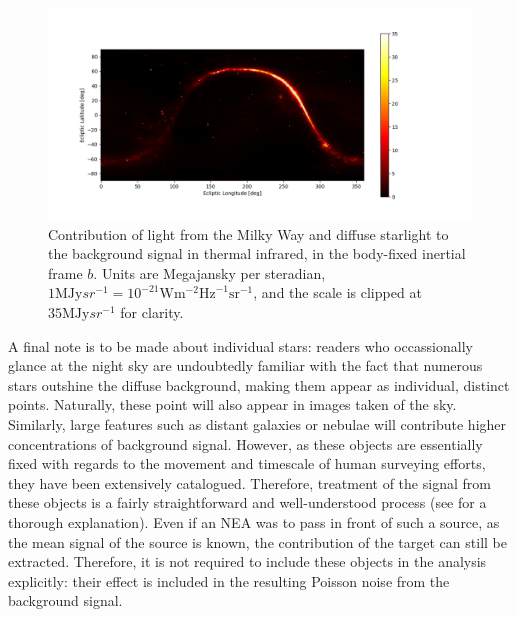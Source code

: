 \begin{figure}[htbp]
 \centering
 \includegraphics[width=1.0\textwidth]{img/background_tir_stars.png}
 \caption{Contribution of light from the Milky Way and diffuse starlight to the background signal in thermal infrared, in the body-fixed inertial frame $b$. Units are Megajansky per steradian, $1 \mathrm{MJy}{sr}^{-1} = 10^{-21} \mathrm{W}\mathrm{m}^{-2}\mathrm{Hz}^{-1}\mathrm{sr}^{-1}$, and the scale is clipped at $35 \mathrm{MJy}{sr}^{-1}$ for clarity.}
 \label{fig:starstirbackground}
\end{figure}

A final note is to be made about individual stars: readers who occassionally glance at the night sky are undoubtedly familiar with the fact that numerous stars outshine the diffuse background, making them appear as individual, distinct points. Naturally, these point will also appear in images taken of the sky. Similarly, large features such as distant galaxies or nebulae will contribute higher concentrations of background signal. However, as these objects are essentially fixed with regards to the movement and timescale of human surveying efforts, they have been extensively catalogued. Therefore, treatment of the signal from these objects is a fairly straightforward and well-understood process (see \cite{StarRemoval} for a thorough explanation). Even if an NEA was to pass in front of such a source, as the mean signal of the source is known, the contribution of the target can still be extracted. Therefore, it is not required to include these objects in the analysis explicitly: their effect is included in the resulting Poisson noise from the background signal.

